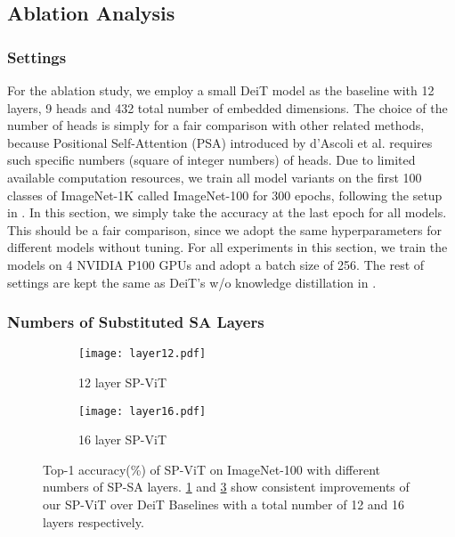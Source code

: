 \documentclass[authorversion, sigconf, acmthm=false, nonacm=true]{acmart}
\begin{document}
\subsection{Ablation Analysis}
\label{sec:ablation}
\subsubsection{Settings}
For the ablation study,
we employ a small DeiT model as the  baseline with 12 layers, 9 heads and 432 total number of embedded dimensions.
The choice of the number of heads is simply for a fair comparison with other related methods, because Positional Self-Attention (PSA) introduced by d’Ascoli et al. \cite{d'ascoli2021convit} requires such specific numbers (square of integer numbers) of heads.
Due to limited available computation resources, we 
train all model variants on the first 100 classes of ImageNet-1K called ImageNet-100 for 300 epochs, following the setup in \cite{d'ascoli2021convit}.
In this section, we simply take the accuracy at the last epoch for all models. 
This should be a fair comparison, since we adopt the same hyperparameters for different models without tuning.  
For all experiments in this section, we train the models on 4 NVIDIA P100 GPUs and adopt a batch size of 256. 
The rest of settings are kept the same as DeiT's w/o knowledge distillation in \cite{touvron2021training}.




\subsubsection{Numbers of Substituted SA Layers}


\begin{figure}[h]
  \centering
  \begin{subfigure}[12 layer SP-ViT]{0.23\textwidth}
      \texttt{[image: layer12.pdf]}
      \caption{12 layer SP-ViT}
      \label{12_layer}
  \end{subfigure}
  \begin{subfigure}[16 layer SP-ViT]{0.23\textwidth}
      \texttt{[image: layer16.pdf]}
      \caption{16 layer SP-ViT}
      \label{16_layer}
  \end{subfigure}

  \caption{Top-1 accuracy(\%) of SP-ViT on ImageNet-100 with different numbers of SP-SA layers. \cref{12_layer} and \cref{16_layer} show consistent improvements of our SP-ViT over DeiT Baselines with a total number of 12 and 16 layers respectively.}
\end{figure}
  
\end{document}
